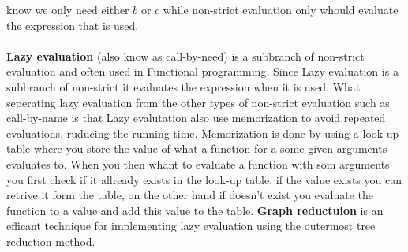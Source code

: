 know we only need either $b$ or $c$ while non-strict evaluation only whould evaluate the expression that is used.
\\ \\
\textbf{Lazy evaluation} (also know as call-by-need) is a subbranch 
of non-strict evaluation and often used in Functional programming. Since Lazy evaluation is a subbranch of non-strict it evaluates 
the expression when it is used. What seperating lazy evaluation from the other types of non-strict evaluation such as call-by-name
is that Lazy evalutation also use memorization to avoid repeated evaluations, ruducing the running time. Memorization is done by using a 
look-up table where you store the value of what a function for a some given arguments evaluates to. When you then whant to evaluate a 
function with som arguments you first check if it allready exists in the look-up table, if the value exists you can retrive it form the table, on the 
other hand if doesn't exist you evaluate the function to a value and add this value to the table.
\textbf{Graph reductuion} is an efficant technique for implementing lazy evaluation using the outermost tree reduction method.
